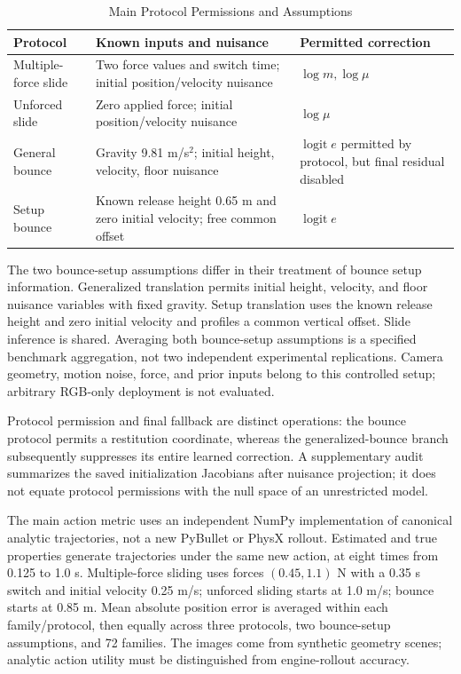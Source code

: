 \documentclass{ieeeaccess}
\begin{document}
\begin{table}[t]\caption{Main Protocol Permissions and Assumptions}\label{tab:protocol}\centering\small\setlength{\tabcolsep}{3pt}
\begin{tabular}{>{\raggedright\arraybackslash}p{}>{\raggedright\arraybackslash}p{}>{\raggedright\arraybackslash}p{}}
\toprule Protocol & Known inputs and nuisance & Permitted correction \\ \midrule
Multiple-force slide & Two force values and switch time; initial position/velocity nuisance & $\log m,\log\mu$ \\
Unforced slide & Zero applied force; initial position/velocity nuisance & $\log\mu$ \\
General bounce & Gravity 9.81 m/s$^2$; initial height, velocity, floor nuisance & $\operatorname{logit}e$ permitted by protocol, but final residual disabled \\
Setup bounce & Known release height 0.65 m and zero initial velocity; free common offset & $\operatorname{logit}e$ \\
\bottomrule\end{tabular}\end{table}

The two bounce-setup assumptions differ in their treatment of bounce setup information. Generalized translation permits initial height, velocity, and floor nuisance variables with fixed gravity. Setup translation uses the known release height and zero initial velocity and profiles a common vertical offset. Slide inference is shared. Averaging both bounce-setup assumptions is a specified benchmark aggregation, not two independent experimental replications. Camera geometry, motion noise, force, and prior inputs belong to this controlled setup; arbitrary RGB-only deployment is not evaluated.

Protocol permission and final fallback are distinct operations: the bounce protocol permits a restitution coordinate, whereas the generalized-bounce branch subsequently suppresses its entire learned correction. A supplementary audit summarizes the saved initialization Jacobians after nuisance projection; it does not equate protocol permissions with the null space of an unrestricted model.

The main action metric uses an independent NumPy implementation of canonical analytic trajectories, not a new PyBullet or PhysX rollout. Estimated and true properties generate trajectories under the same new action, at eight times from 0.125 to 1.0 s. Multiple-force sliding uses forces $(0.45,1.1)$ N with a 0.35 s switch and initial velocity 0.25 m/s; unforced sliding starts at 1.0 m/s; bounce starts at 0.85 m. Mean absolute position error is averaged within each family/protocol, then equally across three protocols, two bounce-setup assumptions, and 72 families. The images come from synthetic geometry scenes; analytic action utility must be distinguished from engine-rollout accuracy.
\end{document}

